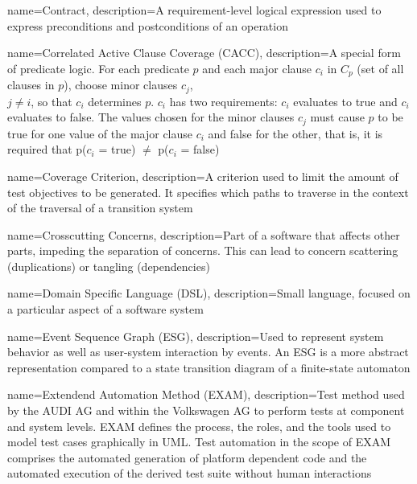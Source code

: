{
	name={Contract},
	description={A requirement-level logical expression used to express preconditions and postconditions of an operation \cite{ClementineNebut2006}}
}

{
	name={Correlated Active Clause Coverage (CACC)},
	description={A special form of predicate logic. For each predicate $p$ and each major clause $c_i$  in $C_p$ (set of all clauses in $p$), choose minor clauses $c_j$,\\ $j \neq i$, so that $c_i$ determines $p$. $c_i$ has two requirements: $c_i$ evaluates to true and $c_i$ evaluates to false. The values chosen for the minor clauses $c_j$ must cause $p$ to be true for one value of the major clause $c_i$ and false for the other, that is, it is required that p($c_i$ = true) $\neq$ p($c_i$ = false) \cite{Ammann2021}}
}

{
	name={Coverage Criterion},
	description={A criterion used to limit the amount of test objectives to be generated. It specifies which paths to traverse in the context of the traversal of a transition system \cite{ClementineNebut2006}}
}

{
	name={Crosscutting Concerns},
	description={Part of a software that affects other parts, impeding the separation of concerns. This can lead to concern scattering (duplications) or tangling (dependencies) \cite{Metsa}}
}

{
	name={Domain Specific Language (DSL)},
	description={Small language, focused on a particular aspect of a software system \cite{Fowler2010}}
}

{
	name={Event Sequence Graph (ESG)},
	description={Used to represent system behavior as well as user-system interaction by events. An ESG is a more abstract representation compared to a state transition diagram of a finite-state automaton \cite{Belli2009}}
}

{
	name={Extendend Automation Method (EXAM)},
	description={Test method used by the AUDI AG and within the Volkswagen AG to perform tests at component and system levels. EXAM defines the process, the roles, and the tools used to model test cases graphically in UML. Test automation in the scope of EXAM comprises the automated generation of platform dependent code and the automated execution of the derived test suite without human interactions \cite{Siegl2010}}
}

